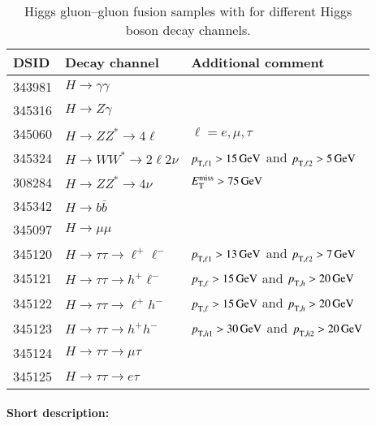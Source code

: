 \begin{table}[!htbp]
  \caption{\POWHEG Higgs gluon--gluon fusion samples with \POWPY[8] for different Higgs boson decay channels.}%
  \label{tab:higgs-ggH-samples}
  \centering
  \begin{tabular}{ l | l | l}
    \toprule
    DSID   & Decay channel & Additional comment \\
    \midrule
    343981 & \(H\to\gamma\gamma\)&   \\
    345316 & \(H\to Z\gamma\) & \\
    345060 & \(H\to ZZ^{*} \to 4\ell \) & \(\ell=e,\mu,\tau\)   \\
    345324 & \(H\to WW^{*} \to 2\ell2\nu \) &  \(\pTX[][\ell1] > \SI{15}{\GeV}\) and \(\pTX[][\ell2] > \SI{5}{\GeV}\) \\
    308284 & \(H\to ZZ^{*}\to 4\nu\) & \(E_{\text{T}}^{\text{miss}} > \SI{75}{\ensuremath{\text{GeV}}}\)\\
    345342 & \(H\to b \bar{b}\) & \\
    345097 & \(H\to\mu\mu\)      &     \\
    345120 & \(H\to\tau\tau\to \ell^{+}\ell^{-}\) & \(\pTX[][\ell1] > \SI{13}{\GeV}\) and \(\pTX[][\ell2] > \SI{7}{\GeV}\) \\
    345121 & \(H\to\tau\tau\to h^{+}\ell^{-}\)    & \(\pTX[][\ell]  > \SI{15}{\GeV}\) and \(\pTX[][h]     > \SI{20}{\GeV}\) \\
    345122 & \(H\to\tau\tau\to \ell^{+}h^{-}\)    & \(\pTX[][\ell]  > \SI{15}{\GeV}\) and \(\pTX[][h]     > \SI{20}{\GeV}\) \\
    345123 & \(H\to\tau\tau\to h^{+}h^{-}\)       & \(\pTX[][h1]    > \SI{30}{\GeV}\) and \(\pTX[][h2]    > \SI{20}{\GeV}\) \\
    345124 & \(H\to\tau\tau\to \mu\tau\)          & \\ %
    345125 & \(H\to\tau\tau\to e \tau\)           & \\ %
    \bottomrule
  \end{tabular}
\end{table}

\paragraph{Short description:}

